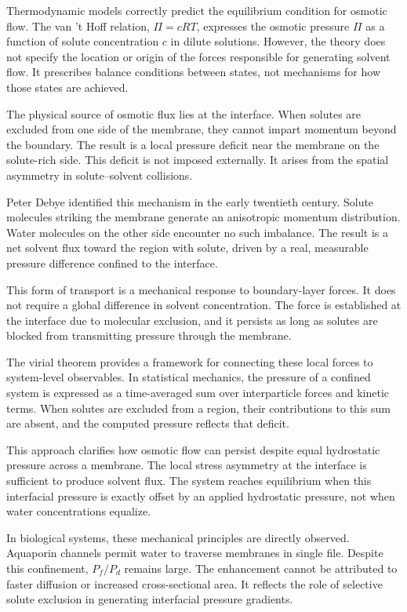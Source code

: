 Thermodynamic models correctly predict the equilibrium condition for osmotic flow. The van ’t Hoff relation, $\Pi = cRT$, expresses the osmotic pressure $\Pi$ as a function of solute concentration $c$ in dilute solutions. However, the theory does not specify the location or origin of the forces responsible for generating solvent flow. It prescribes balance conditions between states, not mechanisms for how those states are achieved.

The physical source of osmotic flux lies at the interface. When solutes are excluded from one side of the membrane, they cannot impart momentum beyond the boundary. The result is a local pressure deficit near the membrane on the solute-rich side. This deficit is not imposed externally. It arises from the spatial asymmetry in solute–solvent collisions.

Peter Debye identified this mechanism in the early twentieth century. Solute molecules striking the membrane generate an anisotropic momentum distribution. Water molecules on the other side encounter no such imbalance. The result is a net solvent flux toward the region with solute, driven by a real, measurable pressure difference confined to the interface.

This form of transport is a mechanical response to boundary-layer forces. It does not require a global difference in solvent concentration. The force is established at the interface due to molecular exclusion, and it persists as long as solutes are blocked from transmitting pressure through the membrane.

The virial theorem provides a framework for connecting these local forces to system-level observables. In statistical mechanics, the pressure of a confined system is expressed as a time-averaged sum over interparticle forces and kinetic terms. When solutes are excluded from a region, their contributions to this sum are absent, and the computed pressure reflects that deficit.

This approach clarifies how osmotic flow can persist despite equal hydrostatic pressure across a membrane. The local stress asymmetry at the interface is sufficient to produce solvent flux. The system reaches equilibrium when this interfacial pressure is exactly offset by an applied hydrostatic pressure, not when water concentrations equalize.

In biological systems, these mechanical principles are directly observed. Aquaporin channels permit water to traverse membranes in single file. Despite this confinement, $P_f / P_d$ remains large. The enhancement cannot be attributed to faster diffusion or increased cross-sectional area. It reflects the role of selective solute exclusion in generating interfacial pressure gradients.


